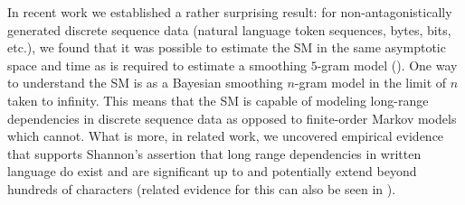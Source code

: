 \documentclass[10pt]{article}
\begin{document}
In recent work we established a rather surprising result: for non-antagonistically generated discrete sequence data (natural language token sequences, bytes, bits, etc.), we found that it was possible to estimate  the SM in the same asymptotic space and time as is required to estimate a smoothing $5$-gram model \citep{Wood2009} ().  One way to understand the SM is as a Bayesian smoothing $n$-gram model in the limit of $n$ taken to infinity.  This means that the SM is capable of modeling long-range dependencies in discrete sequence data as opposed to finite-order Markov models which cannot.  What is more, in related work, we uncovered empirical evidence that supports Shannon's assertion \citep{Shannon1951} that long range dependencies in written language do exist and are significant up to and potentially extend beyond hundreds of characters \cite{Gasthaus2010} (related evidence for this can also be seen in ).  
\end{document}
